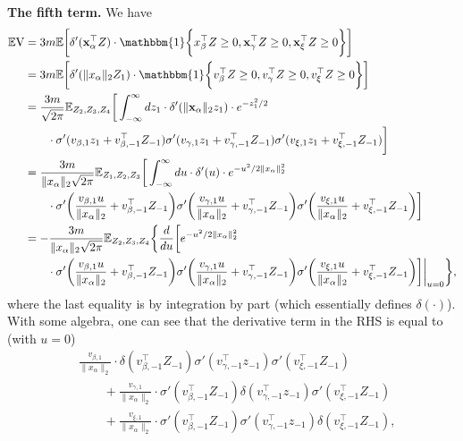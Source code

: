 {\bf The fifth term.} We have 
\begin{align*}
	\bbE \RN{5} & = 3m \bbE \bigg[\delta'(\rvx_\alpha^\top Z)\cdot \mathbbm{1}\bigg\{x_\beta^\top Z \geq 0,\rvx_\gamma^\top Z \geq 0,\rvx_\xi^\top Z \geq 0 \bigg\}\bigg] \\
	& = 3m \bbE \bigg[\delta'(\|x_\alpha\|_2 Z_1) \cdot \mathbbm{1}\bigg\{v_\beta^\top Z \geq 0, v_\gamma^\top Z \geq 0, v_\xi^\top Z \geq 0\bigg\}\bigg] \\
	& =  \frac{3m}{\sqrt{2\pi}} \bbE_{Z_2, Z_3, Z_4} \bigg[\int_{-\infty}^{\infty} dz_1   \cdot \delta'(\|\rvx_\alpha\|_2 z_1) \cdot e^{-z_1^2/2} \\
	& \qquad \cdot \sigma'(v_{\beta, 1}z_1 + v_{\beta, -1}^\top Z_{-1})\sigma'(v_{\gamma, 1}z_1 + v_{\gamma, -1}^\top Z_{-1})\sigma'(v_{\xi, 1}z_1 + v_{\xi, -1}^\top Z_{-1})\bigg] \\
	& = \frac{3m}{\|x_\alpha \|_2\sqrt{2\pi}} \bbE_{Z_1, Z_2, Z_3} \bigg[ \int_{-\infty}^\infty du \cdot \delta'(u) \cdot e^{-{u^2}/{2\|x_\alpha\|_2^2}}\\
	& \qquad \cdot \sigma'\bigg(\frac{v_{\beta, 1}u}{\|x_\alpha\|_2} + v_{\beta, -1}^\top Z_{-1}\bigg)\sigma'\bigg(\frac{v_{\gamma, 1}u}{\|x_\alpha\|_2} + v_{\gamma, -1}^\top Z_{-1}\bigg)\sigma'\bigg(\frac{v_{\xi, 1}u}{\|x_\alpha\|_2} + v_{\xi, -1}^\top Z_{-1}\bigg)\bigg] \\
	& = -\frac{3m}{\|x_\alpha \|_2\sqrt{2\pi}}\bbE_{Z_2, Z_3, Z_4} \bigg\{\frac{d}{du}\bigg[ e^{-{u^2}/{2\|x_\alpha\|_2^2}} \\
	& \qquad \cdot\sigma'\bigg(\frac{v_{\beta, 1}u}{\|x_\alpha\|_2} + v_{\beta, -1}^\top Z_{-1}\bigg)\sigma'\bigg(\frac{v_{\gamma, 1}u}{\|x_\alpha\|_2} + v_{\gamma, -1}^\top Z_{-1}\bigg)\sigma'\bigg(\frac{v_{\xi, 1}u}{\|x_\alpha\|_2} + v_{\xi, -1}^\top Z_{-1}\bigg)\bigg]\bigg|_{u=0}\bigg\},
\end{align*}
where the last equality is by integration by part (which essentially defines $\delta(\cdot)$).
With some algebra, one can see that the derivative term in the RHS is equal to (with $u = 0$)
\begin{align*}
	& \frac{v_{\beta, 1}}{\|x_\alpha\|_2}\cdot \delta(v_{\beta, -1}^\top Z_{-1})  \sigma'(v_{\gamma, -1}^\top z_{-1}) \sigma'(v_{\xi, -1}^\top Z_{-1}) \\
	& \qquad + \frac{v_{\gamma, 1}}{\|x_\alpha\|_2}\cdot \sigma'(v_{\beta, -1}^\top Z_{-1})  \delta(v_{\gamma, -1}^\top z_{-1}) \sigma'(v_{\xi, -1}^\top Z_{-1})  \\
	& \qquad + \frac{v_{\xi, 1}}{\|x_\alpha\|_2}\cdot \sigma'(v_{\beta, -1}^\top Z_{-1})  \sigma'(v_{\gamma, -1}^\top z_{-1}) \delta(v_{\xi, -1}^\top Z_{-1}),
\end{align*}

